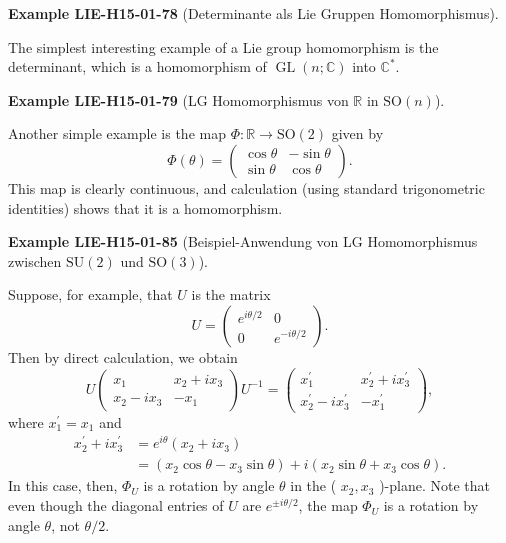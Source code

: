 \documentclass[10pt, letterpaper]{article}
\newcommand{\R}{\mathbb{R}}
\newcommand{\SO}{\mathrm{SO}}
\newcommand{\SU}{\mathrm{SU}}
\newcommand{\CustomHeading}[3]{%
  \par\medskip\noindent%
  \textbf{#1 #2} \textnormal{(#3)}.\enskip%
}
\newenvironment{EXA}[2]{\CustomHeading{Example}{#1}{#2}}{}
\begin{document}
\begin{EXA}{LIE-H15-01-78}{Determinante als Lie Gruppen Homomorphismus}
The simplest interesting example of a Lie group homomorphism is the determinant, which is a homomorphism of $\operatorname{GL}(n ; \mathbb{C})$ into $\mathbb{C}^{*}$.
\end{EXA}

\begin{EXA}{LIE-H15-01-79}{LG Homomorphismus von $\R$ in $\SO(n)$}
Another simple example is the map $\Phi: \mathbb{R} \rightarrow \mathrm{SO}(2)$ given by
$$
\Phi(\theta)=\left(\begin{array}{rr}
\cos \theta & -\sin \theta \\
\sin \theta & \cos \theta
\end{array}\right) .
$$
This map is clearly continuous, and calculation (using standard trigonometric identities) shows that it is a homomorphism.
\end{EXA}

\begin{EXA}{LIE-H15-01-85}{Beispiel-Anwendung von LG Homomorphismus zwischen $\SU(2)$ und $\SO(3)$}
Suppose, for example, that $U$ is the matrix
$$
U=\left(\begin{array}{cc}
e^{i \theta / 2} & 0 \\
0 & e^{-i \theta / 2}
\end{array}\right) .
$$
Then by direct calculation, we obtain
$$
U\left(\begin{array}{cc}
x_{1} & x_{2}+i x_{3} \\
x_{2}-i x_{3} & -x_{1}
\end{array}\right) U^{-1}=\left(\begin{array}{cc}
x_{1}^{\prime} & x_{2}^{\prime}+i x_{3}^{\prime} \\
x_{2}^{\prime}-i x_{3}^{\prime} & -x_{1}^{\prime}
\end{array}\right),
$$
where $x_{1}^{\prime}=x_{1}$ and
$$
\begin{aligned}
x_{2}^{\prime}+i x_{3}^{\prime} & =e^{i \theta}\left(x_{2}+i x_{3}\right) \\
& =\left(x_{2} \cos \theta-x_{3} \sin \theta\right)+i\left(x_{2} \sin \theta+x_{3} \cos \theta\right) .
\end{aligned}
$$
In this case, then, $\Phi_{U}$ is a rotation by angle $\theta$ in the ( $x_{2}, x_{3}$ )-plane. Note that even though the diagonal entries of $U$ are $e^{ \pm i \theta / 2}$, the map $\Phi_{U}$ is a rotation by angle $\theta$, not $\theta / 2$.
\end{EXA}
\end{document}
